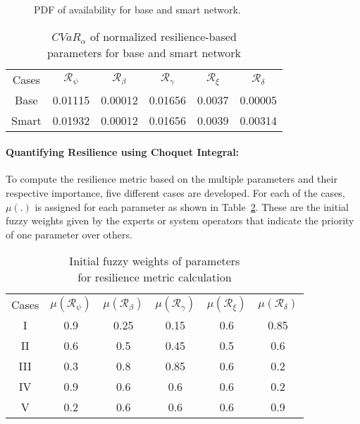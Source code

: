 \begin{figure}
    \centering
    \vspace{-5pt}
    \caption{PDF of availability for base and smart network.}
    \label{fig:availability}
\end{figure}


\begin{table}[h]
    \centering
    \caption{$CVaR_\alpha$ of normalized resilience-based \\ parameters for base and smart network}
    \begin{tabular}{c|c|c|c|c|c}
    \hline
          Cases & $\mathcal{R}_\psi$ & $\mathcal{R}_\beta$ & $\mathcal{R}_\gamma$ & $\mathcal{R}_\xi$ & $\mathcal{R}_\delta$  \\
    \hhline{======}
         Base & 0.01115 & 0.00012 & 0.01656 & 0.0037 & 0.00005 \\
    \hline
         Smart & 0.01932 & 0.00012 & 0.01656 & 0.0039 & 0.00314 \\ 
    \hline
    \end{tabular}
    \label{tab:CVAR}
\end{table}



\paragraph{Quantifying Resilience using Choquet Integral:}
To compute the resilience metric based on the multiple parameters and their respective importance, five different cases are developed. For each of the cases, $\mu(.)$ is assigned for each parameter as shown in Table~\ref{tab:weights}. These are the initial fuzzy weights given by the experts or system operators that indicate the priority of one parameter over others.   


\begin{table}[h]
    \centering
    \caption{Initial fuzzy weights of parameters \\ for resilience metric calculation}
    \begin{tabular}{c|c|c|c|c|c}
    \hline
          Cases & $\mu(\mathcal{R}_\psi)$ & $\mu(\mathcal{R}_\beta)$ & $\mu(\mathcal{R}_\gamma)$ & $\mu(\mathcal{R}_\xi)$ & $\mu(\mathcal{R}_\delta)$  \\
    \hhline{======}
        I & 0.9 & 0.25 & 0.15 & 0.6 & 0.85 \\
    \hline
        II & 0.6 & 0.5 & 0.45 & 0.5 & 0.6 \\ 
    \hline
        III & 0.3 & 0.8 & 0.85 & 0.6 & 0.2 \\ 
    \hline
        IV & 0.9 & 0.6 & 0.6 & 0.6 & 0.2 \\ 
    \hline
        V & 0.2 & 0.6 & 0.6 & 0.6 & 0.9 \\ 
    \hline
    \end{tabular}
    \label{tab:weights}
\end{table}

